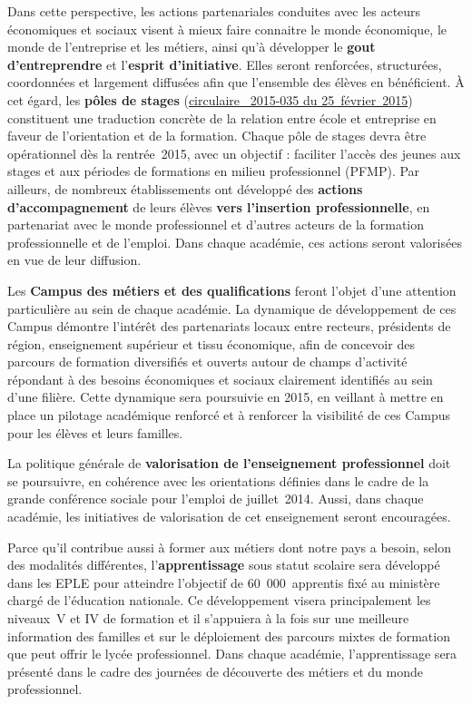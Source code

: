 Dans cette perspective, les actions partenariales conduites avec les acteurs économiques et sociaux visent à mieux faire connaitre le monde économique, le monde de l’entreprise et les métiers, ainsi qu’à développer le \textbf{gout d’entreprendre} et l’\textbf{esprit d’initiative}. Elles seront renforcées, structurées, coordonnées et largement diffusées afin que l’ensemble des élèves en bénéficient. À cet égard, les \textbf{pôles de stages} (\href{http://www.education.gouv.fr/pid25535/bulletin_officiel.html?cid_bo=86521}{circulaire \no{}~2015-035 du 25~février~2015}) constituent une traduction concrète de la relation entre école et entreprise en faveur de l’orientation et de la formation. Chaque pôle de stages devra être opérationnel dès la rentrée~2015, avec un objectif : faciliter l’accès des jeunes aux stages et aux périodes de formations en milieu professionnel (PFMP). Par ailleurs, de nombreux établissements ont développé des \textbf{actions d’accompagnement} de leurs élèves \textbf{vers l’insertion professionnelle}, en partenariat avec le monde professionnel et d’autres acteurs de la formation professionnelle et de l’emploi. Dans chaque académie, ces actions seront valorisées en vue de leur diffusion.

Les \textbf{Campus des métiers et des qualifications} feront l’objet d’une attention particulière au sein de chaque académie. La dynamique de développement de ces Campus démontre l’intérêt des partenariats locaux entre recteurs, présidents de région, enseignement supérieur et tissu économique, afin de concevoir des parcours de formation diversifiés et ouverts autour de champs d’activité répondant à des besoins économiques et sociaux clairement identifiés au sein d’une filière. Cette dynamique sera poursuivie en 2015, en veillant à mettre en place un pilotage académique renforcé et à renforcer la visibilité de ces Campus pour les élèves et leurs familles.

La politique générale de \textbf{valorisation de l’enseignement professionnel} doit se poursuivre, en cohérence avec les orientations définies dans le cadre de la grande conférence sociale pour l’emploi de juillet~2014. Aussi, dans chaque académie, les initiatives de valorisation de cet enseignement seront encouragées.

Parce qu’il contribue aussi à former aux métiers dont notre pays a besoin, selon des modalités différentes, l’\textbf{apprentissage} sous statut scolaire sera développé dans les EPLE pour atteindre l’objectif de 60~000~apprentis fixé au ministère chargé de l’éducation nationale. Ce développement visera principalement les niveaux~V et IV de formation et il s’appuiera à la fois sur une meilleure information des familles et sur le déploiement des parcours mixtes de formation que peut offrir le lycée professionnel. Dans chaque académie, l’apprentissage sera présenté dans le cadre des journées de découverte des métiers et du monde professionnel.

